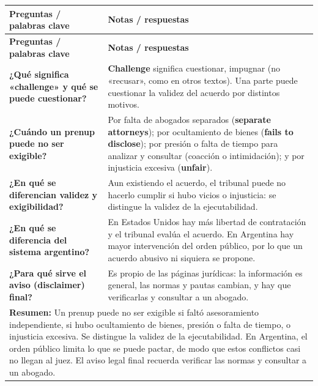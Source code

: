 \documentclass[12pt,oneside]{book}
\newlength{\cornL}
\newlength{\cornR}
\newlength{\cornW}
\begin{document}
\begin{longtable}{@{}p{\cornL}|p{\cornR}@{}}
\toprule
\textbf{Preguntas / palabras clave} & \textbf{Notas / respuestas} \\
\midrule
\endfirsthead
\toprule
\textbf{Preguntas / palabras clave} & \textbf{Notas / respuestas} \\
\midrule
\endhead
\bottomrule
\endfoot
\bottomrule
\endlastfoot

\textbf{¿Qué significa «challenge» y qué se puede cuestionar?} &
\textbf{Challenge} significa cuestionar, impugnar (no «recusar», como en otros textos). Una parte puede cuestionar la validez del acuerdo por distintos motivos. \\[0.6em]

\textbf{¿Cuándo un prenup puede no ser exigible?} &
Por falta de abogados separados (\textbf{separate attorneys}); por ocultamiento de bienes (\textbf{fails to disclose}); por presión o falta de tiempo para analizar y consultar (coacción o intimidación); y por injusticia excesiva (\textbf{unfair}). \\[0.6em]

\textbf{¿En qué se diferencian validez y exigibilidad?} &
Aun existiendo el acuerdo, el tribunal puede no hacerlo cumplir si hubo vicios o injusticia: se distingue la validez de la ejecutabilidad. \\[0.6em]

\textbf{¿En qué se diferencia del sistema argentino?} &
En Estados Unidos hay más libertad de contratación y el tribunal evalúa el acuerdo. En Argentina hay mayor intervención del orden público, por lo que un acuerdo abusivo ni siquiera se propone. \\[0.6em]

\textbf{¿Para qué sirve el aviso (disclaimer) final?} &
Es propio de las páginas jurídicas: la información es general, las normas y pautas cambian, y hay que verificarlas y consultar a un abogado. \\[0.6em]

\midrule
\multicolumn{2}{p{\cornW}}{%
\textbf{Resumen:} Un prenup puede no ser exigible si faltó asesoramiento independiente, si hubo ocultamiento de bienes, presión o falta de tiempo, o injusticia excesiva. Se distingue la validez de la ejecutabilidad. En Argentina, el orden público limita lo que se puede pactar, de modo que estos conflictos casi no llegan al juez. El aviso legal final recuerda verificar las normas y consultar a un abogado.
} \\
\end{longtable}
\end{document}
